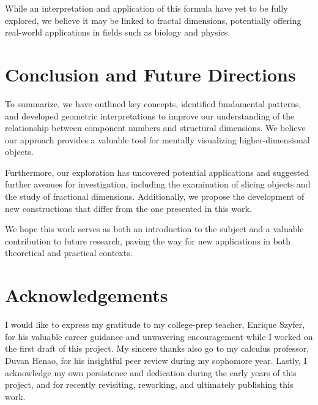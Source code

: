 \documentclass{article}
\begin{document}
	While an interpretation and application of this formula have yet to be fully explored, we believe it may be linked to fractal dimensions, potentially offering real-world applications in fields such as biology and physics.

	
	\section{Conclusion and Future Directions \label{sec:conclusion}}
	
	To summarize, we have outlined key concepts, identified fundamental patterns, and developed geometric interpretations to improve our understanding of the relationship between component numbers and structural dimensions. We believe our approach provides a valuable tool for mentally visualizing higher-dimensional objects.
	
	Furthermore, our exploration has uncovered potential applications and suggested further avenues for investigation, including the examination of slicing objects and the study of fractional dimensions. Additionally, we propose the development of new constructions that differ from the one presented in this work.
	
	We hope this work serves as both an introduction to the subject and a valuable contribution to future research, paving the way for new applications in both theoretical and practical contexts.
	

	
	\section*{Acknowledgements}
	
	I would like to express my gratitude to my college-prep teacher, Enrique Szyfer, for his valuable career guidance and unwavering encouragement while I worked on the first draft of this project. My sincere thanks also go to my calculus professor, Duvan Henao, for his insightful peer review during my sophomore year. Lastly, I acknowledge my own persistence and dedication during the early years of this project, and for recently revisiting, reworking, and ultimately publishing this work.
	
	
	
	
	
	
	
\end{document}
